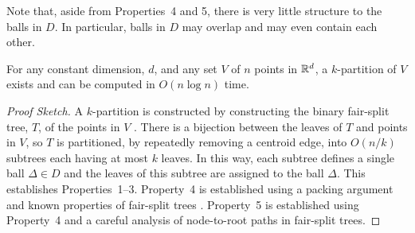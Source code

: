 \documentclass{patmorin}
\begin{document}
Note that, aside from Properties~4 and 5, there is very little structure
to the balls in $D$. In particular, balls in $D$ may overlap and may
even contain each other.  

\begin{lem}
  For any constant dimension, $d$, and any set $V$ of $n$ points in
  $\mathbb{R}^d$, a $k$-partition of $V$ exists and can be computed in $O(n\log
  n)$ time.
\end{lem}

\begin{proof}[Proof Sketch]
  A $k$-partition is constructed by constructing the binary fair-split
  tree, $T$, of the points in $V$ \cite{callahan.kosaraju:decomposition}.
  There is a bijection between the leaves of $T$ and points in $V$, so $T$
  is partitioned, by repeatedly removing a centroid edge, into $O(n/k)$
  subtrees each having at most $k$ leaves.  In this way, each subtree
  defines a single ball $\Delta\in D$ and the leaves of this subtree
  are assigned to the ball $\Delta$.  This establishes Properties~1--3.
  Property~4 is established using a packing argument and known properties
  of fair-split trees \cite[Lemma~9.4.3]{narasimhan.smid:geometric}.
  Property~5 is established using Property~4 and a careful analysis of
  node-to-root paths in fair-split trees.
%
%

\end{proof}
\end{document}
